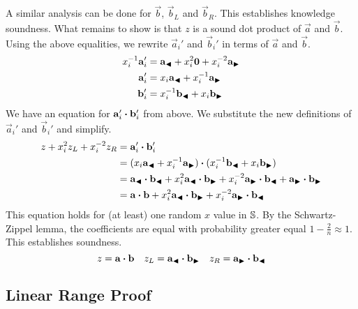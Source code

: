 %
A similar analysis can be done for $\vec{b}$, $\vec{b}_L$ and $\vec{b}_R$.
%
This establishes knowledge soundness.
What remains to show is that $z$ is a sound dot product of $\vec{a}$ and $\vec{b}$.
Using the above equalities,
we rewrite $\vec{a}_i'$ and $\vec{b}_i'$ in terms of $\vec{a}$ and $\vec{b}$.
%
\begin{align*}
    x_i^{-1}\mathbf{a}_i' &= \mathbf{a}_{\blacktriangleleft} + x_i^2 \mathbf{0} + x_i^{-2} \mathbf{a}_{\blacktriangleright} \\
    \mathbf{a}_i' &= x_i \mathbf{a}_{\blacktriangleleft} + x_i^{-1} \mathbf{a}_{\blacktriangleright} \\
    \mathbf{b}_i' &= x_i^{-1} \mathbf{b}_{\blacktriangleleft} + x_i \mathbf{b}_{\blacktriangleright}
\end{align*}
%
We have an equation for $\mathbf{a}_i' \boldsymbol{\cdot} \mathbf{b}_i'$ from above.
We substitute the new definitions of $\vec{a}_i'$ and $\vec{b}_i'$ and simplify.
%
\begin{align*}
    z + x_i^2z_L + x_i^{-2}z_R
    &= \mathbf{a}_i' \boldsymbol{\cdot} \mathbf{b}_i' \\
    &= (x_i \mathbf{a}_{\blacktriangleleft} + x_i^{-1} \mathbf{a}_{\blacktriangleright}) \boldsymbol{\cdot} (x_i^{-1} \mathbf{b}_{\blacktriangleleft} + x_i \mathbf{b}_{\blacktriangleright}) \\
    &= \mathbf{a}_{\blacktriangleleft} \boldsymbol{\cdot} \mathbf{b}_{\blacktriangleleft} + x_i^2 \mathbf{a}_{\blacktriangleleft} \boldsymbol{\cdot} \mathbf{b}_{\blacktriangleright} + x_i^{-2} \mathbf{a}_{\blacktriangleright} \boldsymbol{\cdot} \mathbf{b}_{\blacktriangleleft} + \mathbf{a}_{\blacktriangleright} \boldsymbol{\cdot} \mathbf{b}_{\blacktriangleright} \\
    &= \mathbf{a} \boldsymbol{\cdot} \mathbf{b} + x_i^2 \mathbf{a}_{\blacktriangleleft} \boldsymbol{\cdot} \mathbf{b}_{\blacktriangleright} + x_i^{-2} \mathbf{a}_{\blacktriangleright} \boldsymbol{\cdot} \mathbf{b}_{\blacktriangleleft}
\end{align*}
%
This equation holds for (at least) one random $x$ value in $\mathbb{S}$.
By the Schwartz-Zippel lemma,
the coefficients are equal with probability greater equal $1 - \frac{2}{n} \approx 1$.
This establishes soundness.
%
\[
    z = \mathbf{a} \boldsymbol{\cdot} \mathbf{b} \quad z_L = \mathbf{a}_{\blacktriangleleft} \boldsymbol{\cdot} \mathbf{b}_{\blacktriangleright} \quad z_R = \mathbf{a}_{\blacktriangleright} \boldsymbol{\cdot} \mathbf{b}_{\blacktriangleleft}
\]

\subsection{Linear Range Proof}

